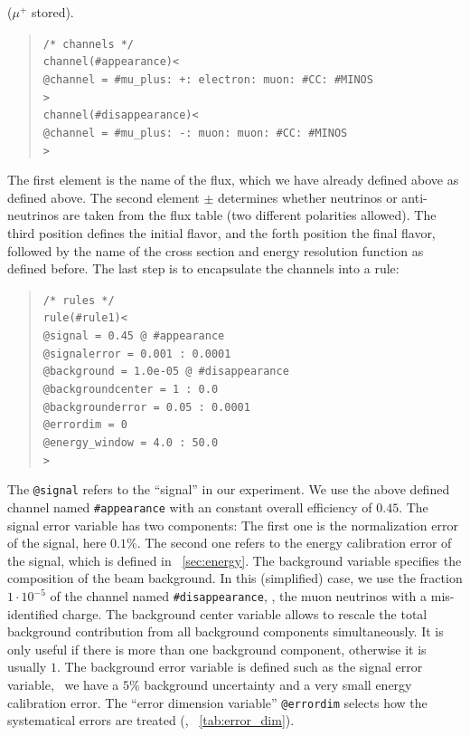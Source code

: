 ($\mu^+$ stored).
\begin{quote}
{\tt /* channels */}\\
{\tt channel(\#appearance)<}\\
{\tt \tb @channel = \#mu\_plus: +: electron: muon: \#CC: \#MINOS}\\
{\tt >}\\
{\tt channel(\#disappearance)<}\\
{\tt \tb @channel = \#mu\_plus: -: muon: muon: \#CC: \#MINOS}\\
{\tt >}
\end{quote}
The first element is the name of the flux, which we have already defined above as defined above. The second element $\pm$ determines whether 
neutrinos or anti-neutrinos are taken from the flux table (two different polarities allowed). The third position defines the initial flavor,
and the forth position the final flavor, followed by the name of the cross
section and energy resolution function as defined before.
%
The last step is to encapsulate the channels into a rule:
\begin{quote}
{\tt /* rules */}\\
{\tt rule(\#rule1)<}\\
{\tt \tb @signal = 0.45 @ \#appearance}\\
{\tt \tb @signalerror = 0.001 : 0.0001}\\
{\tt \tb @background = 1.0e-05 @ \#disappearance}\\
{\tt \tb @backgroundcenter = 1 : 0.0}\\
{\tt \tb @backgrounderror = 0.05 : 0.0001}\\
{\tt \tb @errordim = 0}\\
{\tt \tb @energy\_window = 4.0 : 50.0}\\
{\tt >}
\end{quote}
The {\tt @signal} refers to the ``signal'' in our experiment. We use the
above defined channel named {\tt \#appearance} with an constant overall
efficiency of $0.45$. The signal error variable has two components: 
The first one is the normalization error of the signal, here $0.1\%$. The second 
one refers to the energy calibration error of the signal, which is defined 
in \Sec~\ref{sec:energy}. The background variable
specifies the composition of the beam background. In this (simplified) case, we
use the fraction $1\cdot 10^{-5}$ of the channel named {\tt \#disappearance}, \ie , the muon neutrinos with a mis-identified charge. The background center variable allows to rescale the total background contribution from all background components
simultaneously. It is only useful if there is more than one background component, otherwise it is usually $1$. The background error variable is defined such as the signal error variable, \ie\ we have a $5\%$ background uncertainty and a very small energy calibration error. The ``error dimension variable'' {\tt @errordim} selects how the systematical errors are treated (\cf, \Tab~\ref{tab:error_dim}). 

